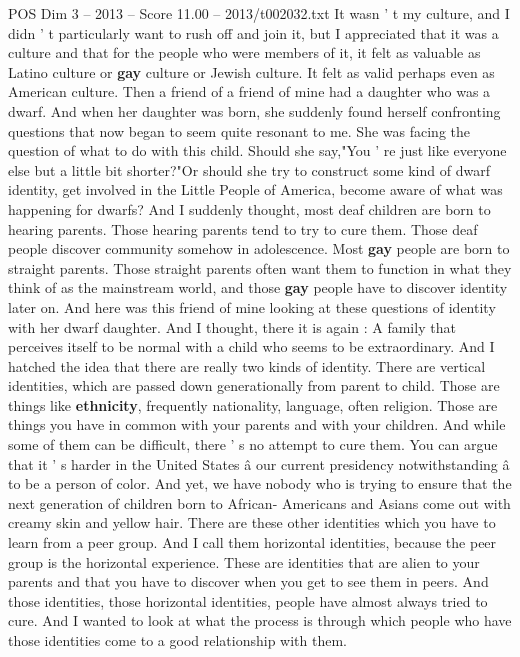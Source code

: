 \begin{textsample}{POS Dim 3 – 2013 – Score 11.00 – 2013/t002032.txt}
It wasn ' t my culture, and I didn ' t particularly want to rush off and join it, but I appreciated that it was a culture and that for the people who were members of it, it felt as valuable as Latino culture or \textbf{gay} culture or Jewish culture.
It felt as valid perhaps even as American culture.
Then a friend of a friend of mine had a daughter who was a dwarf.
And when her daughter was born, she suddenly found herself confronting questions that now began to seem quite resonant to me.
She was facing the question of what to do with this child.
Should she say,"You ' re just like everyone else but a little bit shorter?"Or should she try to construct some kind of dwarf identity, get involved in the Little People of America, become aware of what was happening for dwarfs?
And I suddenly thought, most deaf children are born to hearing parents.
Those hearing parents tend to try to cure them.
Those deaf people discover community somehow in adolescence.
Most \textbf{gay} people are born to straight parents.
Those straight parents often want them to function in what they think of as the mainstream world, and those \textbf{gay} people have to discover identity later on.
And here was this friend of mine looking at these questions of identity with her dwarf daughter.
And I thought, there it is again : A family that perceives itself to be normal with a child who seems to be extraordinary.
And I hatched the idea that there are really two kinds of identity.
There are vertical identities, which are passed down generationally from parent to child.
Those are things like \textbf{ethnicity}, frequently nationality, language, often religion.
Those are things you have in common with your parents and with your children.
And while some of them can be difficult, there ' s no attempt to cure them.
You can argue that it ' s harder in the United States â our current presidency notwithstanding â to be a person of color.
And yet, we have nobody who is trying to ensure that the next generation of children born to African- Americans and Asians come out with creamy skin and yellow hair.
There are these other identities which you have to learn from a peer group.
And I call them horizontal identities, because the peer group is the horizontal experience.
These are identities that are alien to your parents and that you have to discover when you get to see them in peers.
And those identities, those horizontal identities, people have almost always tried to cure.
And I wanted to look at what the process is through which people who have those identities come to a good relationship with them.

\end{textsample}

